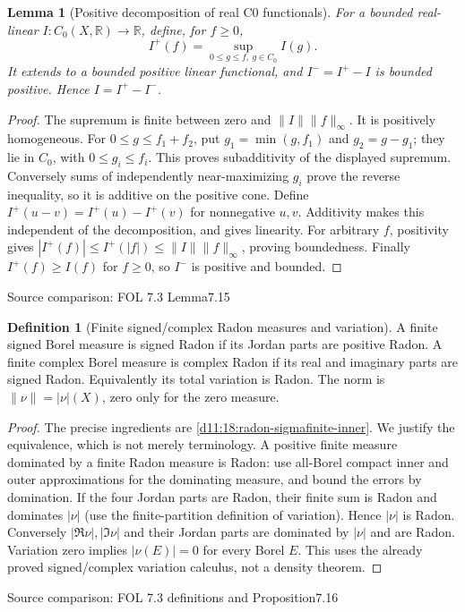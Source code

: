 \documentclass[11pt,oneside,openany]{book}
\newtheorem{lemma}[theorem]{Lemma}
\theoremstyle{definition}
\newtheorem{definition}[theorem]{Definition}
\theoremstyle{remark}
\newcommand{\R}{\mathbb R}\newcommand{\C}{\mathbb C}
\newcommand{\family}[1]{}
\newcommand{\source}[1]{\par\begingroup\small\sffamily\color{black!65}Source comparison: #1\par\endgroup}
\begin{document}
\begin{lemma}[Positive decomposition of real C0 functionals]\family{D11.19.functional_jordan}\label{d11:19:functional-jordan}
For a bounded real-linear $I:C_0(X,\R)\to\R$, define, for $f\ge0$,
\[I^+(f)=\sup_{0\le g\le f,\ g\in C_0}I(g).
\]
It extends to a bounded positive linear functional, and $I^-=I^+-I$ is bounded positive. Hence $I=I^+-I^-$.
\end{lemma}
\begin{proof}
The supremum is finite between zero and $\|I\|\|f\|_\infty$. It is positively homogeneous. For $0\le g\le f_1+f_2$, put $g_1=\min(g,f_1)$ and $g_2=g-g_1$; they lie in $C_0$, with $0\le g_i\le f_i$. This proves subadditivity of the displayed supremum. Conversely sums of independently near-maximizing $g_i$ prove the reverse inequality, so it is additive on the positive cone. Define $I^+(u-v)=I^+(u)-I^+(v)$ for nonnegative $u,v$. Additivity makes this independent of the decomposition, and gives linearity. For arbitrary $f$, positivity gives $|I^+(f)|\le I^+(|f|)\le\|I\|\|f\|_\infty$, proving boundedness. Finally $I^+(f)\ge I(f)$ for $f\ge0$, so $I^-$ is positive and bounded.
\end{proof}
\source{FOL 7.3 Lemma7.15}

\begin{definition}[Finite signed/complex Radon measures and variation]\family{D11.19.complex_radon_variation}\label{d11:19:complex-radon-variation}
A finite signed Borel measure is signed Radon if its Jordan parts are positive Radon. A finite complex Borel measure is complex Radon if its real and imaginary parts are signed Radon. Equivalently its total variation is Radon. The norm is $\|\nu\|=|\nu|(X)$, zero only for the zero measure.
\end{definition}
\begin{proof}
The precise ingredients are \cref{d11:18:radon-sigmafinite-inner}. We justify the equivalence, which is not merely terminology. A positive finite measure dominated by a finite Radon measure is Radon: use all-Borel compact inner and outer approximations for the dominating measure, and bound the errors by domination. If the four Jordan parts are Radon, their finite sum is Radon and dominates $|\nu|$ (use the finite-partition definition of variation). Hence $|\nu|$ is Radon. Conversely $|\Re\nu|,|\Im\nu|$ and their Jordan parts are dominated by $|\nu|$ and are Radon. Variation zero implies $|\nu(E)|=0$ for every Borel $E$. This uses the already proved signed/complex variation calculus, not a density theorem.
\end{proof}
\source{FOL 7.3 definitions and Proposition7.16}
\end{document}
